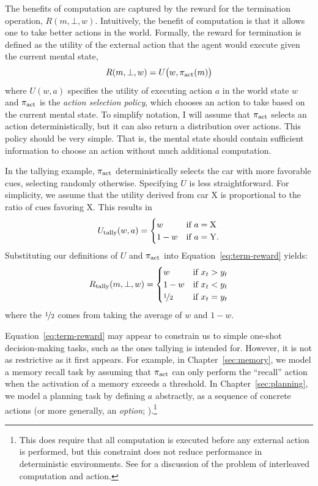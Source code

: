 The benefits of computation are captured by the reward for the termination operation, $R(m, \bot, w)$. Intuitively, the benefit of computation is that it allows one to take better actions in the world. Formally, the reward for termination is defined as the utility of the external action that the agent would execute given the current mental state,
%
\begin{equation}\label{eq:term-reward}
  R(m, \bot, w) = U \big(w, \pi_{\text{act}}(m) \big)
\end{equation}
%
where $U(w, a)$ specifies the utility of executing action $a$ in the world state $w$ and $\pi_{\text{act}}$ is the \emph{action selection policy}, which chooses an action to take based on the current mental state. To simplify notation, I will assume that $\pi_{\text{act}}$ selects an action deterministically, but it can also return a distribution over actions. This policy should be very simple. That is, the mental state should contain sufficient information to choose an action without much additional computation.

In the tallying example, $\pi_{\text{act}}$ deterministically selects the car with more favorable cues, selecting randomly otherwise. Specifying $U$ is less straightforward. For simplicity, we assume that the utility derived from car X is proportional to the ratio of cues favoring X. This results in
\begin{equation}
  U_{\text{tally}}(w, a) = \begin{cases}
    w &\text{if } a = \mathrm{X} \\
    1-w &\text{if } a = \mathrm{Y}.
  \end{cases}
\end{equation}
Substituting our definitions of $U$ and $\pi_{\text{act}}$ into Equation~\ref{eq:term-reward} yields:
\begin{equation}
  R_{\text{tally}}(m, \bot, w) = \begin{cases}
    w &\text{if } x_t > y_t \\
    1-w &\text{if } x_t < y_t \\
    \nicefrac{1}{2} &\text{if } x_t = y_t
  \end{cases}
\end{equation}
where the $\nicefrac{1}{2}$ comes from taking the average of $w$ and $1 - w$.

Equation~\ref{eq:term-reward} may appear to constrain us to simple one-shot decision-making tasks, such as the ones tallying is intended for. However, it is not as restrictive as it first appears. For example, in Chapter~\ref{sec:memory}, we model a memory recall task by assuming that $\pi_{\text{act}}$ can only perform the ``recall'' action when the activation of a memory exceeds a threshold. In Chapter~\ref{sec:planning}, we model a planning task by defining $a$ abstractly, as a sequence of concrete actions (or more generally, an \emph{option}; \citealp{sutton1999mdps}).\footnote{
  This does require that all computation is executed before any external action is performed, but this constraint does not reduce performance in deterministic environments. See \conclusion for a discussion of the problem of interleaved computation and action.
} 

